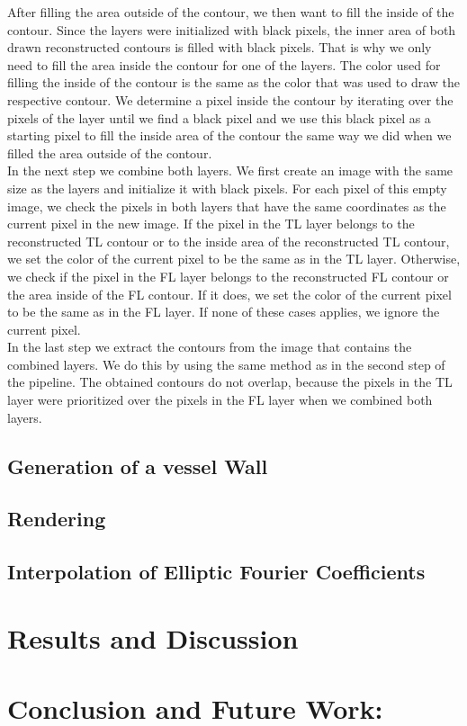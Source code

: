 \documentclass[thesis.tex]{subfiles}
\begin{document}
After filling the area outside of the contour, we then want to fill the inside of the contour. Since the layers were initialized with black pixels, the inner area of both drawn reconstructed contours is filled with black pixels. That is why we only need to fill the area inside the contour for one of the layers. The color used for filling the inside of the contour is the same as the color that was used to draw the respective contour. We determine a pixel inside the contour by iterating over the pixels of the layer until we find a black pixel and we use this black pixel as a starting pixel to fill the inside area of the contour the same way we did when we filled the area outside of the contour. \\
In the next step we combine both layers. We first create an image with the same size as the layers and initialize it with black pixels. For each pixel of this empty image, we check the pixels in both layers that have the same coordinates as the current pixel in the new image. If the pixel in the TL layer belongs to the reconstructed TL contour or to the inside area of the reconstructed TL contour, we set the color of the current pixel to be the same as in the TL layer. Otherwise, we check if the pixel in the FL layer belongs to the reconstructed FL contour or the area inside of the FL contour. If it does, we set the color of the current pixel to be the same as in the FL layer. If none of these cases applies, we ignore the current pixel.\\
In the last step we extract the contours from the image that contains the combined layers. We do this by using the same method as in the second step of the pipeline. The obtained contours do not overlap, because the pixels in the TL layer were prioritized over the pixels in the FL layer when we combined both layers.        

\section{Generation of a vessel Wall}

\section{Rendering}

\section{Interpolation of Elliptic Fourier Coefficients}

\chapter{Results and Discussion}\label{chap:basics}

\chapter{Conclusion and Future Work:}\label{chap:basics}

\subfilebib %
\end{document}
